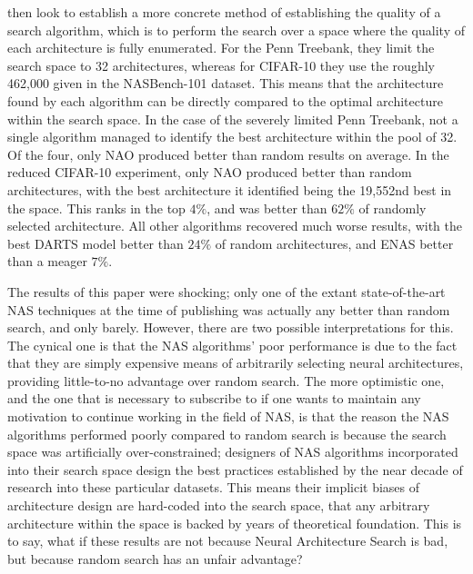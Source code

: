 \citeauthor{yu2019} then look to establish a more concrete method of establishing the quality of a search algorithm, which is to perform the search
over a space where the quality of each architecture is fully enumerated. For the Penn Treebank, they limit the search space to 32 architectures,
whereas for CIFAR-10 they use the roughly 462,000 given in the NASBench-101 dataset. This means that the architecture found by each algorithm
can be directly compared to the optimal architecture within the search space. In the case of the severely limited Penn Treebank, not a
single algorithm managed to identify the best architecture within the pool of 32. Of the four, only NAO produced better than random
results on average. In the reduced CIFAR-10 experiment, only NAO produced better than random architectures, with the best architecture
it identified being the 19,552nd best in the space. This ranks in the top $4\%$, and was better than $62\%$ of randomly selected architecture.
All other algorithms recovered much worse results, with the best DARTS model better than $24\%$ of random architectures, and ENAS better than a meager $7\%$.

The results of this paper were shocking; only one of the extant state-of-the-art NAS techniques at the time of publishing was actually
any better than random search, and only barely. However, there are two possible interpretations for this. The cynical one is that
the NAS algorithms' poor performance is due to the fact that they are simply expensive means of arbitrarily selecting neural
architectures, providing little-to-no advantage over random search. The more optimistic one, and the one that is necessary to
subscribe to if one wants to maintain any motivation to continue working in the field of NAS, is that the reason the NAS algorithms
performed poorly compared to random search is because the search space was artificially over-constrained; designers of NAS algorithms
incorporated into their search space design the best practices established by the near decade of research into these particular datasets.
This means their implicit biases of architecture design are hard-coded into the search space, that any arbitrary architecture within
the space is backed by years of theoretical foundation. This is to say, what if these results are not because Neural Architecture Search
is bad, but because random search has an unfair advantage?

